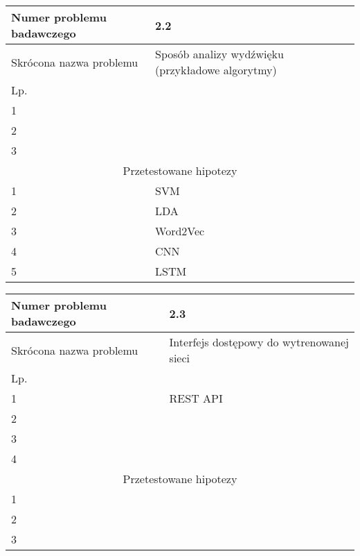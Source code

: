 \documentclass[11pt,a4paper]{article}
\begin{document}
\begin{table}[h]
    \centering
    \begin{tabular}{|p{4.5cm}|p{9cm}|}
        \hline
         Numer problemu badawczego & 2.2 \\
         \hline
         Skrócona nazwa problemu & Sposób analizy wydźwięku (przykładowe algorytmy)\\
         \hline
         Lp. &  \\ \hline
         1 &     \\ \hline
         2 &  \\ \hline
         3 &   \\ \hline
         \multicolumn{2}{|c|}{Przetestowane hipotezy} \\ \hline
         1 &   SVM  \\ \hline
         2 &   LDA\\ \hline
         3 &   Word2Vec\\ \hline
         4 &   CNN\\ \hline
         5 &   LSTM\\ \hline 
    \end{tabular}
    \label{tab:my_label1}
\end{table}

\begin{table}[h]
    \centering
    \begin{tabular}{|p{4.5cm}|p{9cm}|}
        \hline
         Numer problemu badawczego & 2.3 \\
         \hline
         Skrócona nazwa problemu & Interfejs dostępowy do wytrenowanej sieci\\
         \hline
         Lp. &  \\ \hline
         1 &   REST API  \\ \hline
         2 &  \\ \hline
         3 &  \\ \hline
         4 &  \\ \hline
         \multicolumn{2}{|c|}{Przetestowane hipotezy} \\ \hline
         1 &  \\ \hline
         2 &  \\ \hline
         3 &   \\ \hline
    \end{tabular}
    \label{tab:my_label2}
\end{table}
\end{document}
